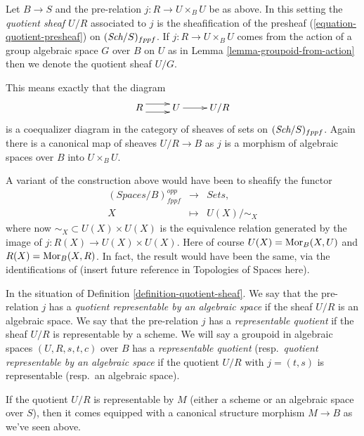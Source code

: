 \begin{definition}
\label{definition-quotient-sheaf}
Let $B \to S$ and the pre-relation $j : R \to U \times_B U$ be as above.
In this setting the {\it quotient sheaf $U/R$} associated
to $j$ is the sheafification of the presheaf
(\ref{equation-quotient-presheaf}) on $(\textit{Sch}/S)_{fppf}$.
If $j : R \to U \times_B U$ comes from the action of a
group algebraic space $G$ over $B$ on $U$ as in
Lemma \ref{lemma-groupoid-from-action}
then we denote the quotient sheaf $U/G$.
\end{definition}

\noindent
This means exactly that the diagram
$$
\xymatrix{
R \ar@<1ex>[r] \ar@<-1ex>[r] &
U \ar[r] &
U/R
}
$$
is a coequalizer diagram in the category of sheaves of sets
on $(\textit{Sch}/S)_{fppf}$. Again there is a canonical map
of sheaves $U/R \to B$ as $j$ is a morphism of algebraic spaces over
$B$ into $U \times_B U$.

\begin{remark}
\label{remark-quotient-variant}
A variant of the construction above would have been to sheafify
the functor
$$
\begin{matrix}
(\textit{Spaces}/B)^{opp}_{fppf} &
\longrightarrow &
\textit{Sets}, \\
X &
\longmapsto  &
U(X)/\sim_X
\end{matrix}
$$
where now $\sim_X \subset U(X) \times U(X)$ is the equivalence relation
generated by the image of $j : R(X) \to U(X) \times U(X)$.
Here of course $U(X) = \mathop{\rm Mor}\nolimits_B(X, U)$ and $R(X) = \mathop{\rm Mor}\nolimits_B(X, R)$.
In fact, the result would have been the same, via the identifications
of (insert future reference in Topologies of Spaces here).
\end{remark}

\begin{definition}
\label{definition-representable-quotient}
In the situation of Definition \ref{definition-quotient-sheaf}.
We say that the pre-relation $j$ has a
{\it quotient representable by an algebraic space}
if the sheaf $U/R$ is an algebraic space.
We say that the pre-relation $j$ has a
{\it representable quotient}
if the sheaf $U/R$ is representable by a scheme.
We will say a groupoid in algebraic spaces $(U, R, s, t, c)$ over $B$ has a
{\it representable quotient}
(resp.\ {\it quotient representable by an algebraic space}
if the quotient $U/R$ with $j = (t, s)$ is representable (resp.\ an
algebraic space).
\end{definition}

\noindent
If the quotient $U/R$ is representable by $M$ (either a scheme or an algebraic
space over $S$), then it comes equipped with a canonical structure morphism
$M \to B$ as we've seen above.

